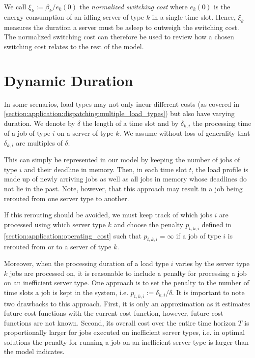 We call $\xi_k := \beta_k / e_k(0)$ the \textit{normalized switching cost} where $e_k(0)$ is the energy consumption of an idling server of type $k$ in a single time slot. Hence, $\xi_k$ measures the duration a server must be asleep to outweigh the switching cost. The normalized switching cost can therefore be used to review how a chosen switching cost relates to the rest of the model.

\section{Dynamic Duration}\label{section:application:dynamic_duration}

In some scenarios, load types may not only incur different costs (as covered in \autoref{section:application:dispatching:multiple_load_types}) but also have varying duration. We denote by $\delta$ the length of a time slot and by $\delta_{k,i}$ the processing time of a job of type $i$ on a server of type $k$. We assume without loss of generality that $\delta_{k,i}$ are multiples of $\delta$.

This can simply be represented in our model by keeping the number of jobs of type $i$ and their deadline in memory. Then, in each time slot $t$, the load profile is made up of newly arriving jobs as well as all jobs in memory whose deadlines do not lie in the past. Note, however, that this approach may result in a job being rerouted from one server type to another.

If this rerouting should be avoided, we must keep track of which jobs $i$ are processed using which server type $k$ and choose the penalty $p_{t,k,i}$ defined in \autoref{section:application:operating_cost} such that $p_{t,k,i} = \infty$ if a job of type $i$ is rerouted from or to a server of type $k$.

Moreover, when the processing duration of a load type $i$ varies by the server type $k$ jobs are processed on, it is reasonable to include a penalty for processing a job on an inefficient server type. One approach is to set the penalty to the number of time slots a job is kept in the system, i.e. $p_{t,k,i} := \delta_{k,i} / \delta$. It is important to note two drawbacks to this approach. First, it is only an approximation as it estimates future cost functions with the current cost function, however, future cost functions are not known. Second, its overall cost over the entire time horizon $T$ is proportionally larger for jobs executed on inefficient server types, i.e. in optimal solutions the penalty for running a job on an inefficient server type is larger than the model indicates.

